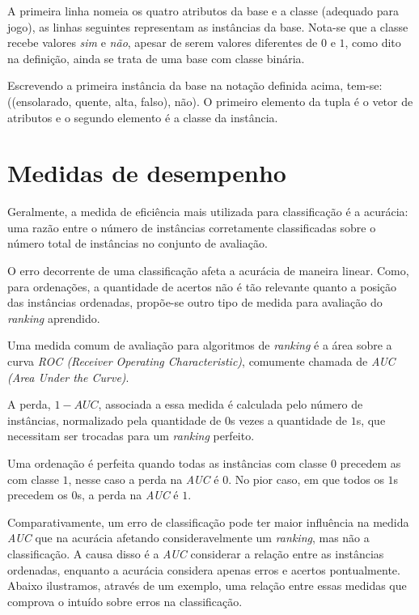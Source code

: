 A primeira linha nomeia os quatro atributos da base e a classe (adequado para jogo), as linhas seguintes representam as instâncias da base. Nota-se que a classe recebe valores \emph{sim} e \emph{não}, apesar de serem valores diferentes de $0$ e $1$, como dito na definição, ainda se trata de uma base com classe binária.

Escrevendo a primeira instância da base na notação definida acima, tem-se: ((ensolarado, quente, alta, falso), não). O primeiro elemento da tupla é o vetor de atributos e o segundo elemento é a classe da instância.


\section{Medidas de desempenho}

Geralmente, a medida de eficiência mais utilizada para classificação é a acurácia: uma razão entre o número de instâncias corretamente classificadas sobre o número total de instâncias no conjunto de avaliação.

O erro decorrente de uma classificação afeta a acurácia de maneira linear. Como, para ordenações, a quantidade de acertos não é tão relevante quanto a posição das instâncias ordenadas, propõe-se outro tipo de medida para avaliação do \emph{ranking} aprendido.

Uma medida comum de avaliação para algoritmos de \emph{ranking} é a área sobre a curva \emph{ROC (Receiver Operating Characteristic)}, comumente chamada de \emph{AUC (Area Under the Curve)}.

A perda, $1 - AUC$, associada a essa medida é calculada pelo número de instâncias, normalizado pela quantidade de $0$s vezes a quantidade de $1$s, que necessitam ser trocadas para um \emph{ranking} perfeito.

% 

Uma ordenação é perfeita quando todas as instâncias com classe $0$ precedem as com classe $1$, nesse caso a perda na \emph{AUC} é $0$. No pior caso, em que todos os $1$s precedem os $0$s, a perda na \emph{AUC} é $1$.

Comparativamente, um erro de classificação pode ter maior influência na medida \emph{AUC} que na acurácia afetando consideravelmente um \emph{ranking}, mas não a classificação. A causa disso é a \emph{AUC} considerar a relação entre as instâncias ordenadas, enquanto a acurácia considera apenas erros e acertos pontualmente. Abaixo ilustramos, através de um exemplo, uma relação entre essas medidas que comprova o intuído sobre erros na classificação.

